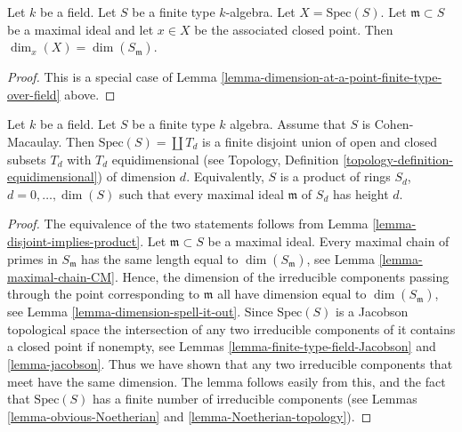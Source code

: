 \begin{lemma}
\label{lemma-dimension-closed-point-finite-type-field}
Let $k$ be a field.
Let $S$ be a finite type $k$-algebra.
Let $X = \text{Spec}(S)$.
Let $\mathfrak m \subset S$ be a maximal ideal and let
$x \in X$ be the associated closed point.
Then $\dim_x(X) = \dim(S_{\mathfrak m})$.
\end{lemma}

\begin{proof}
This is a special case of
Lemma \ref{lemma-dimension-at-a-point-finite-type-over-field} above.
\end{proof}

\begin{lemma}
\label{lemma-disjoint-decomposition-CM-algebra}
Let $k$ be a field.
Let $S$ be a finite type $k$ algebra.
Assume that $S$ is Cohen-Macaulay.
Then $\text{Spec}(S) = \coprod T_d$ is a finite disjoint union of
open and closed subsets $T_d$ with $T_d$ equidimensional
(see Topology, Definition \ref{topology-definition-equidimensional})
of dimension $d$. Equivalently, $S$ is a product of rings
$S_d$, $d = 0, \ldots, \dim(S)$ such that every maximal ideal
$\mathfrak m$ of $S_d$ has height $d$.
\end{lemma}

\begin{proof}
The equivalence of the two statements follows from
Lemma \ref{lemma-disjoint-implies-product}.
Let $\mathfrak m \subset S$ be a maximal ideal.
Every maximal chain of primes in $S_{\mathfrak m}$ has 
the same length equal to $\dim(S_{\mathfrak m})$, see
Lemma \ref{lemma-maximal-chain-CM}. Hence, the dimension of the irreducible
components passing through the point corresponding to $\mathfrak m$
all have dimension equal to $\dim(S_{\mathfrak m})$, see
Lemma \ref{lemma-dimension-spell-it-out}.
Since $\text{Spec}(S)$ is a Jacobson topological space
the intersection
of any two irreducible components of it contains a closed point if nonempty,
see Lemmas \ref{lemma-finite-type-field-Jacobson}
and
\ref{lemma-jacobson}.
Thus we have shown that any two irreducible components
that meet have the same dimension. The lemma follows
easily from this, and the fact that $\text{Spec}(S)$
has a finite number of irreducible components (see 
Lemmas \ref{lemma-obvious-Noetherian} and \ref{lemma-Noetherian-topology}).
\end{proof}
















